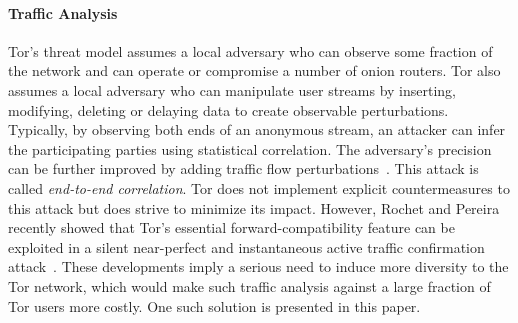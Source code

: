 

\paragraph*{Traffic Analysis}
Tor's threat model assumes a local adversary who can observe some fraction of
the network and can operate or compromise a number of onion routers. Tor also
assumes a local adversary who can manipulate user streams by inserting,
modifying, deleting or delaying data to create observable perturbations.
Typically, by observing both ends of an anonymous stream, an attacker can infer
the participating parties using statistical correlation. The adversary's
precision can be further improved by adding traffic flow
perturbations~\cite{fu2009one}. This attack is called \textit{end-to-end
  correlation}. Tor does not implement explicit countermeasures to this attack
but does strive to minimize its impact. However, Rochet and Pereira recently
showed that Tor's essential forward-compatibility feature can be exploited in a
silent near-perfect and instantaneous active traffic confirmation
attack~\cite{rochet2018dropping}. These developments imply a serious need to
induce more diversity to the Tor network, which would make such traffic analysis
against a large fraction of Tor users more costly. One such solution is
presented in this paper.

